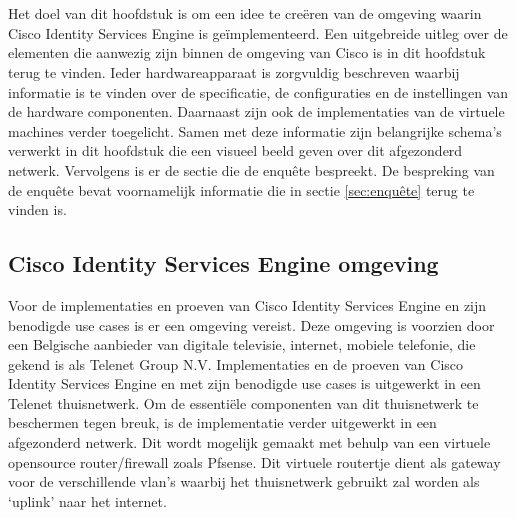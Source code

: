 
\chapter{}
\label{ch:Proof of concept}

Het doel van dit hoofdstuk is om een idee te creëren van de omgeving waarin Cisco Identity Services Engine is geïmplementeerd. Een uitgebreide uitleg over de elementen die aanwezig zijn binnen de omgeving van Cisco is in dit hoofdstuk terug te vinden. Ieder hardwareapparaat is zorgvuldig beschreven waarbij informatie is te vinden over de specificatie, de configuraties en de instellingen van de hardware componenten. Daarnaast zijn ook de implementaties van de virtuele machines verder toegelicht.
\newline
\newline
Samen met deze informatie zijn belangrijke schema’s verwerkt in dit hoofdstuk die een visueel beeld geven over dit afgezonderd netwerk. 
Vervolgens is er de sectie die de enquête bespreekt. De bespreking van de enquête bevat voornamelijk informatie die in sectie \ref{sec:enquête} terug te vinden is. 

\section{Cisco Identity Services Engine omgeving}

Voor de implementaties en proeven van Cisco Identity Services Engine en zijn benodigde use cases is er een omgeving vereist. Deze omgeving is voorzien door een Belgische aanbieder van digitale televisie, internet, mobiele telefonie, die gekend is als Telenet Group N.V. Implementaties en de proeven van Cisco Identity Services Engine en met zijn benodigde use cases is uitgewerkt in een Telenet thuisnetwerk.
\newline
Om de essentiële componenten van dit thuisnetwerk te beschermen tegen breuk, is de implementatie verder uitgewerkt in een afgezonderd netwerk. Dit wordt mogelijk gemaakt met behulp van een virtuele opensource router/firewall zoals Pfsense. Dit virtuele routertje dient als gateway voor de verschillende vlan’s waarbij het thuisnetwerk gebruikt zal worden als ‘uplink’ naar het internet. 



